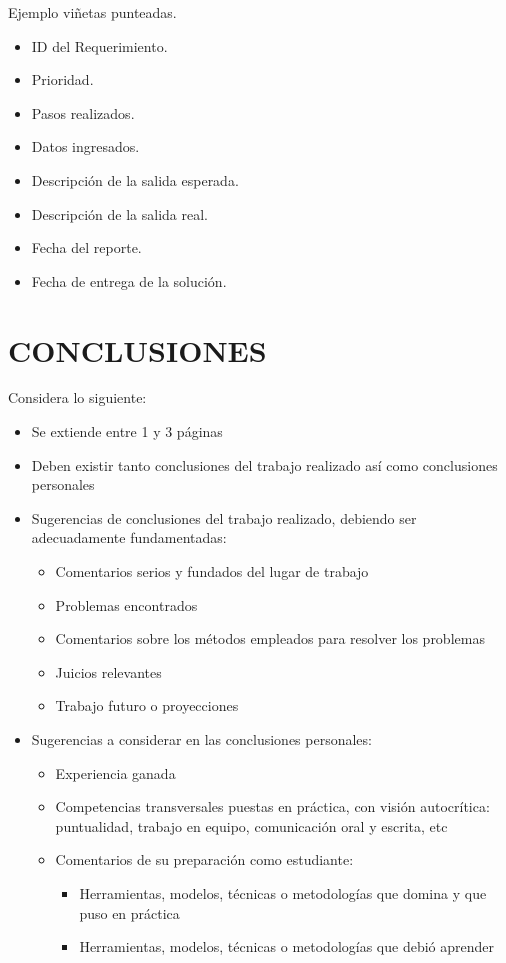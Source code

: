 \documentclass[oneside,12pt, letterpaper, titlepage]{book}
\begin{document}
Ejemplo viñetas punteadas.
\begin{itemize}
\item ID del Requerimiento.
\item Prioridad.
\item Pasos realizados.
\item Datos ingresados.
\item Descripción de la salida esperada.
\item Descripción de la salida real.
\item Fecha del reporte.
\item Fecha de entrega de la solución.
\end{itemize}

\chapter[Conclusiones]{CONCLUSIONES}
Considera lo siguiente:
\begin{itemize}
    \item Se extiende entre 1 y 3 páginas 
    \item Deben existir tanto conclusiones del trabajo realizado así como conclusiones personales 
    \item Sugerencias de conclusiones del trabajo realizado, debiendo ser adecuadamente fundamentadas: 
    \begin{itemize}
        \item Comentarios serios y fundados del lugar de trabajo 
        \item Problemas encontrados 
        \item Comentarios sobre los métodos empleados para resolver los problemas 
        \item Juicios relevantes 
        \item Trabajo futuro o proyecciones 
    \end{itemize}

    \item Sugerencias a considerar en las conclusiones personales: 
    \begin{itemize}
        \item Experiencia ganada 
        \item Competencias transversales puestas en práctica, con visión autocrítica: puntualidad, trabajo en equipo, comunicación oral y escrita, etc
        \item Comentarios de su preparación como estudiante: 
        \begin{itemize}
            \item Herramientas, modelos, técnicas o metodologías que domina y que puso en práctica 
            \item Herramientas, modelos, técnicas o metodologías que debió aprender
        \end{itemize}
    \end{itemize}
\end{itemize}
\end{document}
